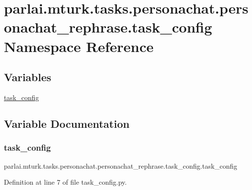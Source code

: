 \hypertarget{namespaceparlai_1_1mturk_1_1tasks_1_1personachat_1_1personachat__rephrase_1_1task__config}{}\section{parlai.\+mturk.\+tasks.\+personachat.\+personachat\+\_\+rephrase.\+task\+\_\+config Namespace Reference}
\label{namespaceparlai_1_1mturk_1_1tasks_1_1personachat_1_1personachat__rephrase_1_1task__config}
\subsection*{Variables}
\begin{DoxyCompactItemize}
\item 
\hyperlink{namespaceparlai_1_1mturk_1_1tasks_1_1personachat_1_1personachat__rephrase_1_1task__config_a72ffd8589a4010ecab010e37bc27b3fe}{task\+\_\+config}
\end{DoxyCompactItemize}


\subsection{Variable Documentation}
\mbox{\label{namespaceparlai_1_1mturk_1_1tasks_1_1personachat_1_1personachat__rephrase_1_1task__config_a72ffd8589a4010ecab010e37bc27b3fe}} 
\subsubsection{\texorpdfstring{task\+\_\+config}{task\_config}}
{\footnotesize\ttfamily parlai.\+mturk.\+tasks.\+personachat.\+personachat\+\_\+rephrase.\+task\+\_\+config.\+task\+\_\+config}



Definition at line 7 of file task\+\_\+config.\+py.

